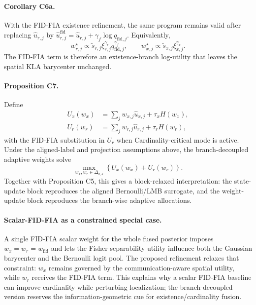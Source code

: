 \paragraph{Corollary C6a.}
With the FID-FIA existence refinement, the same program remains valid after replacing $\hat u_{r,j}$ by $\hat u_{r,j}^{\mathrm{fid}}=\hat u_{r,j}+\gamma_f\log q_{\mathrm{fid},j}$. Equivalently,
\begin{equation}
w_{r,j}^{\star}
\propto
\tilde s_{r,j}
\xi_{r,j}^{\gamma_r}
q_{\mathrm{fid},j}^{\gamma_f},
\qquad
w_{x,j}^{\star}
\propto
\tilde s_{x,j}
\xi_{x,j}^{\gamma_x}.
\label{eq:appendix-fid-branch-weights}
\end{equation}
The FID-FIA term is therefore an existence-branch log-utility that leaves the spatial KLA barycenter unchanged.

\paragraph{Proposition C7.}
Define
\begin{align}
U_x(w_x)
&=
\sum_j w_{x,j}\hat u_{x,j} + \tau_x H(w_x), \\
U_r(w_r)
&=
\sum_j w_{r,j}\hat u_{r,j} + \tau_r H(w_r),
\end{align}
with the FID-FIA substitution in $U_r$ when Cardinality-critical mode is active. Under the aligned-label and projection assumptions above, the branch-decoupled adaptive weights solve
\begin{equation}
\max_{w_x,w_r \in \Delta_{k,s}} \left\{ U_x(w_x) + U_r(w_r) \right\}.
\end{equation}
Together with Proposition C5, this gives a block-relaxed interpretation: the state-update block reproduces the aligned Bernoulli/LMB surrogate, and the weight-update block reproduces the branch-wise adaptive allocations.

\paragraph{Scalar-FID-FIA as a constrained special case.}
A single FID-FIA scalar weight for the whole fused posterior imposes $w_x=w_r=w_{\mathrm{fid}}$ and lets the Fisher-separability utility influence both the Gaussian barycenter and the Bernoulli logit pool. The proposed refinement relaxes that constraint: $w_x$ remains governed by the communication-aware spatial utility, while $w_r$ receives the FID-FIA term. This explains why a scalar FID-FIA baseline can improve cardinality while perturbing localization; the branch-decoupled version reserves the information-geometric cue for existence/cardinality fusion.

